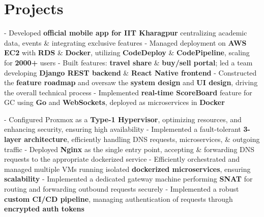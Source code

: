 \documentclass[a4paper,10pt]{extarticle} %
\begin{document}
\section{\textcolor{primary}{Projects}}
 \vspace{0.1cm}
\begin{description}[style=nextline, font=$\bullet$\hspace{2mm}\normalsize]

 \item[{\href{https://play.google.com/store/apps/details?id=com.apnainsti&pli=1}{ApnaInsti}} | Golang, AWS, Docker, Nginx ] 
- Developed \textbf{official mobile app for IIT Kharagpur} centralizing academic data, events \& integrating exclusive features \newline
- Managed deployment on \textbf{AWS EC2} with \textbf{RDS} \& \textbf{Docker}, utilizing \textbf{CodeDeploy} \& \textbf{CodePipeline}, scaling for \textbf{2000+} users \newline
- Built features: \textbf{travel share} \& \textbf{buy/sell portal}; led a team developing \textbf{Django REST backend} \& \textbf{React Native frontend} \newline
- Constructed the \textbf{feature roadmap} and oversaw the \textbf{system design} and \textbf{UI design}, driving the overall technical process \newline
- Implemented \textbf{real-time ScoreBoard} feature for GC using \textbf{Go} and \textbf{WebSockets}, deployed as microservices in \textbf{Docker}

 \item[\href{https://github.com/tsg-iitkgp/ops-architecture}{On-Premise Server Setup \& Management} | Proxmox, Nginx, Docker ] 
- Configured Proxmox as a \textbf{Type-1 Hypervisor}, optimizing resources, and enhancing security, ensuring high availability \newline
- Implemented a fault-tolerant \textbf{3-layer architecture}, efficiently handling DNS requests, microservices, \& outgoing traffic \newline
- Deployed \textbf{Nginx} as the single entry point, accepting \& forwarding DNS requests to the appropriate dockerized service \newline
- Efficiently orchestrated and managed multiple VMs running isolated \textbf{dockerized microservices}, ensuring \textbf{scalability} \newline
- Implemented a dedicated gateway machine performing \textbf{SNAT} for routing and forwarding outbound requests securely \newline
- Implemented a robust \textbf{custom CI/CD pipeline}, managing authentication of requests through \textbf{encrypted auth tokens}


\end{description}
\end{document}

